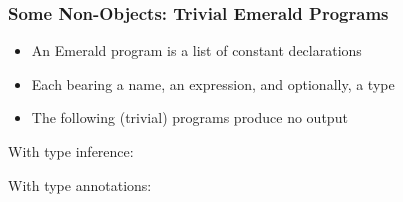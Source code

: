 \begin{frame}[fragile]

\frametitle{Some Non-Objects: Trivial Emerald Programs}

\begin{itemize}

\item An Emerald program is a list of constant declarations

\item Each bearing a name, an expression, and optionally, a type

\item The following (trivial) programs produce no output

\end{itemize}

With type inference:



With type annotations:



\end{frame}

